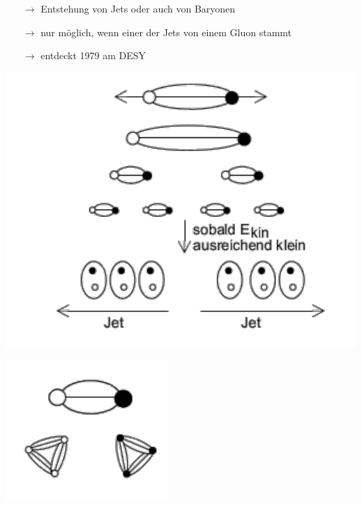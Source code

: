 \begin{itemize}
\begin{enumerate}
\begin{itemize}
\item[$\rightarrow$] Entstehung von Jets oder auch von Baryonen
\item[$\rightarrow$] nur möglich, wenn einer der Jets von einem Gluon stammt
\item[$\rightarrow$] entdeckt 1979 am DESY
\end{itemize}

\begin{minipage}[c]{.39\textwidth}
\captionsetup{type=figure}
\includegraphics[width=\textwidth]{imgs/ep5-fig-7-6.pdf}
\end{minipage}
\begin{minipage}[c]{.39\textwidth}
\captionsetup{type=figure}
\includegraphics[width=\textwidth]{imgs/ep5-fig-7-7.pdf}
\end{minipage}

\end{enumerate}
\end{itemize}
